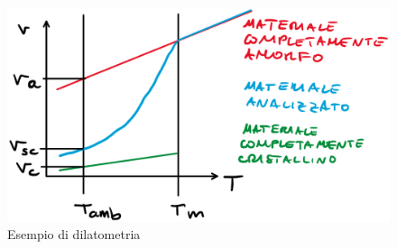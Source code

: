 \begin{figure}
\centering
\includegraphics[width = \textwidth]{gfx/Dilatometria}
\caption{Esempio di dilatometria}
\label{fig:Dilatometria}
\end{figure}


